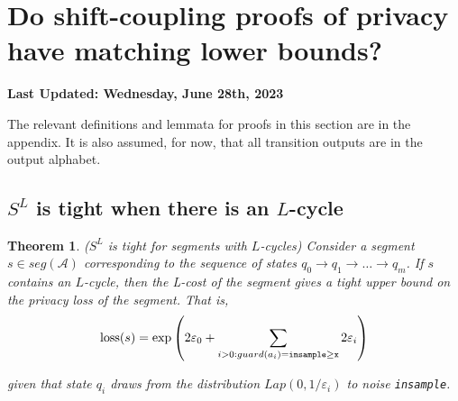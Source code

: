 \documentclass{article}
\newtheorem{theorem}{Theorem}
\renewcommand{\epsilon}{\varepsilon}
\newcommand{\loss}{\textup{loss}}
\newcommand{\insamplegeqx}{\textup{\texttt{insample$\geq$x}}}
\newcommand{\insample}{\textup{\texttt{insample}}}
\newcommand{\1}{\langle 1 \rangle}
\newcommand{\2}{\langle 2 \rangle}
\begin{document}
\section{Do shift-coupling proofs of privacy have matching lower bounds?}
\textbf{Last Updated: Wednesday, June 28th, 2023}

The relevant definitions and lemmata for proofs in this section are in the appendix. It is also assumed, for now, that all transition outputs are in the output alphabet. 

\subsection{$S^L$ is tight when there is an $L$-cycle}

\begin{theorem} ($S^L$ is tight for segments with $L$-cycles)
    Consider a segment $s \in seg(\mathcal{A})$ corresponding to the sequence of states $q_0 \to q_1 \to \dots \to q_m$. If $s$ contains an $L$-cycle, then the L-cost of the segment gives a tight upper bound on the privacy loss of the segment. That is, \[\loss(s) =  \exp\left(2 \epsilon_0 + \sum_{i > 0: guard(a_i) = \insamplegeqx} 2\epsilon_i \right)\]

    given that state $q_i$ draws from the distribution $Lap(0, 1/\epsilon_i)$ to noise \insample.
\end{theorem}
\end{document}
